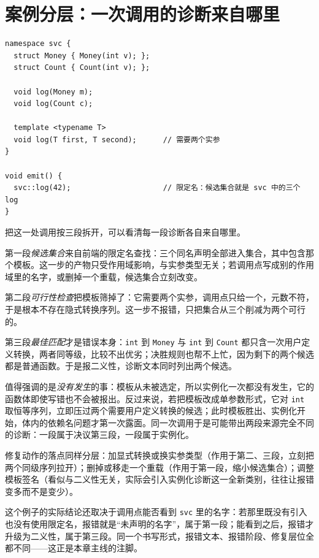 \documentclass[12pt,a4paper,fontset=fandol]{ctexbook}
\newcommand{\Tp}[1]{\texttt{#1}}
\begin{document}
\section{案例分层：一次调用的诊断来自哪里}\label{sec:cl03-case}

\begin{lstlisting}[style=cppstyle,caption={案例源码：两个同族重载与一个参数个数不符的模板}]
namespace svc {
  struct Money { Money(int v); };
  struct Count { Count(int v); };

  void log(Money m);
  void log(Count c);

  template <typename T>
  void log(T first, T second);      // 需要两个实参
}

void emit() {
  svc::log(42);                     // 限定名：候选集合就是 svc 中的三个 log
}
\end{lstlisting}

\begin{note}[title={案例：诊断的三段来源与一次都没发生的实例化}]
把这一处调用按三段拆开，可以看清每一段诊断各自来自哪里。

第一段\emph{候选集合}来自前端的限定名查找：三个同名声明全部进入集合，其中包含那个模板。这一步的产物只受作用域影响，与实参类型无关；若调用点写成别的作用域里的名字，或删掉一个重载，候选集合立刻改变。

第二段\emph{可行性检查}把模板筛掉了：它需要两个实参，调用点只给一个，元数不符，于是根本不存在隐式转换序列。这一步不报错，只把集合从三个削减为两个可行的。

第三段\emph{最佳匹配}才是错误本身：\Tp{int} 到 \Tp{Money} 与 \Tp{int} 到 \Tp{Count} 都只含一次用户定义转换，两者同等级，比较不出优劣；决胜规则也帮不上忙，因为剩下的两个候选都是普通函数。于是报二义性，诊断文本同时列出两个候选。

值得强调的是\emph{没有发生}的事：模板从未被选定，所以实例化一次都没有发生，它的函数体即使写错也不会被报出。反过来说，若把模板改成单参数形式，它对 \Tp{int} 取恒等序列，立即压过两个需要用户定义转换的候选；此时模板胜出、实例化开始，体内的依赖名问题才第一次露面。同一次调用于是可能带出两段来源完全不同的诊断：一段属于决议第三段，一段属于实例化。

修复动作的落点同样分层：加显式转换或换实参类型（作用于第二、三段，立刻把两个同级序列拉开）；删掉或移走一个重载（作用于第一段，缩小候选集合）；调整模板签名（看似与二义性无关，实际会引入实例化诊断这一全新类别，往往让报错变多而不是变少）。
\end{note}

这个例子的实际结论还取决于调用点能否看到 \Tp{svc} 里的名字：若那里既没有引入也没有使用限定名，报错就是“未声明的名字”，属于第一段；能看到之后，报错才升级为二义性，属于第三段。同一个书写形式，报错文本、报错阶段、修复层位全都不同——这正是本章主线的注脚。
\end{document}
